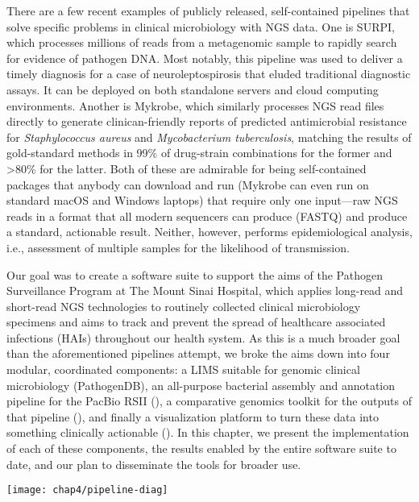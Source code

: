 There are a few recent examples of publicly released, self-contained pipe\-lines that solve specific problems in clinical microbiology with NGS data. One is SURPI, which processes millions of reads from a metagenomic sample to rapidly search for evidence of pathogen DNA.\autocite{Naccache2014} Most notably, this pipeline was used to deliver a timely diagnosis for a case of neuroleptospirosis that eluded traditional diagnostic assays.\autocite{Wilson2014} It can be deployed on both standalone servers and cloud computing environments.\autocite{Naccache2014} Another is Mykrobe, which similarly processes NGS read files directly to generate clinican-friendly reports of predicted antimicrobial resistance for \emph{Staphylococcus aureus} and \emph{Mycobacterium tuberculosis}, matching the results of gold-standard methods in 99\% of drug-strain combinations for the former and >80\% for the latter.\autocite{Bradley2015} Both of these are admirable for being self-contained packages that anybody can download and run (Mykrobe can even run on standard macOS and Windows laptops) that require only one input—raw NGS reads in a format that all modern sequencers can produce (FASTQ) and produce a standard, actionable result. Neither, however, performs epidemiological analysis, i.e., assessment of multiple samples for the likelihood of transmission.

Our goal was to create a software suite to support the aims of the Pathogen Surveillance Program at The Mount Sinai Hospital, which applies long-read and short-read NGS technologies to routinely collected clinical microbiology specimens and aims to track and prevent the spread of healthcare associated infections (HAIs) throughout our health system. As this is a much broader goal than the aforementioned pipelines attempt, we broke the aims down into four modular, coordinated components: a LIMS suitable for genomic clinical microbiology (PathogenDB), an all-purpose bacterial assembly and annotation pipeline for the PacBio RSII (\pathogendbpipeline), a comparative genomics toolkit for the outputs of that pipeline (\pathogendbcomparison), and finally a visualization platform to turn these data into something clinically actionable (\pathogendbviz). In this chapter, we present the implementation of each of these components, the results enabled by the entire software suite to date, and our plan to disseminate the tools for broader use.

\begin{sidewaysfigure}[hp]
  \sidewaysvspace
  \centering
  \texttt{[image: chap4/pipeline-diag]}
\end{sidewaysfigure}

